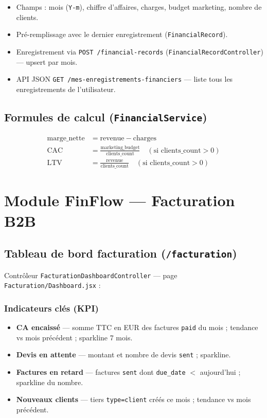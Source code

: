 \documentclass[11pt,a4paper]{report}
\newcommand{\route}[1]{\texttt{\small #1}}
\newcommand{\ctrl}[1]{\texttt{\small #1}}
\newcommand{\svc}[1]{\texttt{\small #1}}
\newcommand{\model}[1]{\texttt{\small #1}}
\newcommand{\feat}[1]{\textbf{#1}}
\begin{document}
\begin{itemize}[leftmargin=*]
    \item Champs : mois (\texttt{Y-m}), chiffre d'affaires, charges, budget marketing, nombre de clients.
    \item Pré-remplissage avec le dernier enregistrement (\model{FinancialRecord}).
    \item Enregistrement via \route{POST /financial-records} (\ctrl{FinancialRecordController}) — upsert par mois.
    \item API JSON \route{GET /mes-enregistrements-financiers} — liste tous les enregistrements de l'utilisateur.
\end{itemize}

\section{Formules de calcul (\svc{FinancialService})}

\begin{align*}
\text{marge\_nette} &= \text{revenue} - \text{charges} \\
\text{CAC} &= \frac{\text{marketing\_budget}}{\text{clients\_count}} \quad (\text{si clients\_count} > 0) \\
\text{LTV} &= \frac{\text{revenue}}{\text{clients\_count}} \quad (\text{si clients\_count} > 0)
\end{align*}

\chapter{Module FinFlow — Facturation B2B}

\section{Tableau de bord facturation (\route{/facturation})}

Contrôleur \ctrl{FacturationDashboardController} — page \texttt{Facturation/Dashboard.jsx} :

\subsection{Indicateurs clés (KPI)}

\begin{itemize}[leftmargin=*]
    \item \feat{CA encaissé} — somme TTC en EUR des factures \texttt{paid} du mois ; tendance vs mois précédent ; sparkline 7 mois.
    \item \feat{Devis en attente} — montant et nombre de devis \texttt{sent} ; sparkline.
    \item \feat{Factures en retard} — factures \texttt{sent} dont \texttt{due\_date} $<$ aujourd'hui ; sparkline du nombre.
    \item \feat{Nouveaux clients} — tiers \texttt{type=client} créés ce mois ; tendance vs mois précédent.
\end{itemize}
\end{document}
